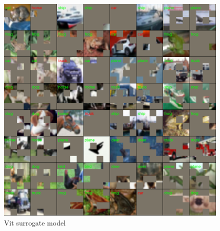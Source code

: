 \documentclass[magisterska,en]{pracamgr}
\begin{document}
\begin{figure}[H]
\centering
\includegraphics[scale=0.5]{./images/vit_surrogate_masks.png}
\caption{Vit surrogate model}
\label{vit_surrogate_masks}
\end{figure}
\end{document}
